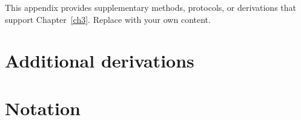 %

This appendix provides supplementary methods, protocols, or derivations that support Chapter~\ref{ch3}. Replace with your own content.

\section{Additional derivations}

\lipsum[61-62]

\section{Notation}

\lipsum[67]
